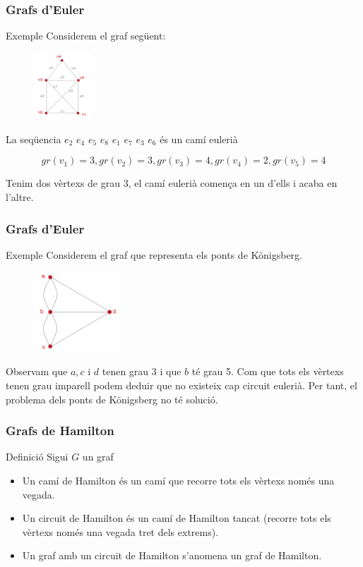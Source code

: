 \documentclass{beamer}
\begin{document}
\begin{frame}
\frametitle{Grafs d'Euler}
\begin{block}{Exemple }
Considerem el graf següent:
\begin{figure}[h]
 \label{fig:volum}
\centering
\includegraphics[height=2.5cm]{g10}
\end{figure}
La seqüencia $e_2$ $e_4$ $e_5$ $e_8$ $e_1$ $e_7$ $e_3$ $e_6$ és un camí eulerià

\[gr(v_1)=3,gr(v_2)=3,gr(v_3)=4,gr(v_4)=2,gr(v_5)=4\]

Tenim dos vèrtexs de grau 3, el camí eulerià comença en un d'ells i acaba en l'altre. 

\end{block}
\end{frame}







\begin{frame}
\frametitle{Grafs d'Euler}
\begin{block}{Exemple }
Considerem el graf que representa els ponts de Königsberg. \begin{figure}[h]
 \label{fig:volum}
\centering
\includegraphics[height=3cm]{g11}
\end{figure}

Observam que $a,c$ i $d$ tenen grau 3 i que $b$ té grau 5. Com que tots els vèrtexs tenen grau imparell podem deduir que no existeix cap circuit eulerià. Per tant, el problema dels ponts de Königsberg no té solució. 
\end{block}
\end{frame}





\begin{frame}
\frametitle{Grafs de Hamilton}
\begin{block}{Definició }
Sigui $G$ un graf

\begin{itemize}
\item Un camí de Hamilton és un camí que recorre tots els vèrtexs només una vegada. 
\item Un circuit de Hamilton és un camí de Hamilton tancat (recorre tots els vèrtexs només una vegada tret dels extrems). 
\item Un graf amb un circuit de Hamilton s'anomena un graf de Hamilton. 
\end{itemize}
\end{block}
\end{frame}
\end{document}
